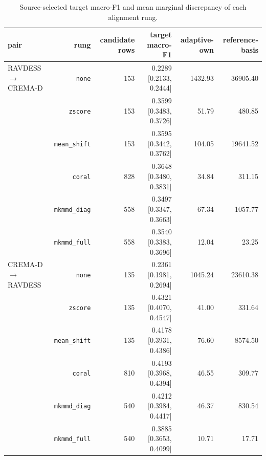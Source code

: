 \begin{table}[!t]
  \centering
  \caption{Source-selected target macro-F1 and mean marginal discrepancy of each alignment rung.}
  \label{tab:ladder}
  \begin{tabular}{lrrrrr}
    \toprule
    pair & rung & candidate rows & target macro-F1 & adaptive-own & reference-basis \\
    \midrule
    RAVDESS $\rightarrow$ CREMA-D & \texttt{none} & 153 & 0.2289 [0.2133, 0.2444] & 1432.93 & 36905.40 \\
     & \texttt{zscore} & 153 & 0.3599 [0.3483, 0.3726] & 51.79 & 480.85 \\
     & \texttt{mean\_shift} & 153 & 0.3595 [0.3442, 0.3762] & 104.05 & 19641.52 \\
     & \texttt{coral} & 828 & 0.3648 [0.3480, 0.3831] & 34.84 & 311.15 \\
     & \texttt{mkmmd\_diag} & 558 & 0.3497 [0.3347, 0.3663] & 67.34 & 1057.77 \\
     & \texttt{mkmmd\_full} & 558 & 0.3540 [0.3383, 0.3696] & 12.04 & 23.25 \\
    CREMA-D $\rightarrow$ RAVDESS & \texttt{none} & 135 & 0.2361 [0.1981, 0.2694] & 1045.24 & 23610.38 \\
     & \texttt{zscore} & 135 & 0.4321 [0.4070, 0.4547] & 41.00 & 331.64 \\
     & \texttt{mean\_shift} & 135 & 0.4178 [0.3931, 0.4386] & 76.60 & 8574.50 \\
     & \texttt{coral} & 810 & 0.4193 [0.3968, 0.4394] & 46.55 & 309.77 \\
     & \texttt{mkmmd\_diag} & 540 & 0.4212 [0.3984, 0.4417] & 46.37 & 830.54 \\
     & \texttt{mkmmd\_full} & 540 & 0.3885 [0.3653, 0.4099] & 10.71 & 17.71 \\
    \bottomrule
  \end{tabular}
\end{table}

